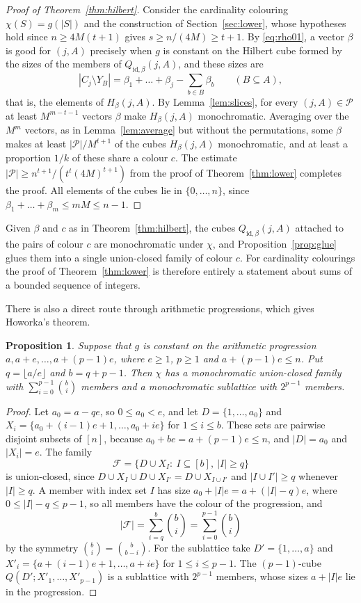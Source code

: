 \documentclass[11pt,reqno]{amsart}
\numberwithin{equation}{section}
\theoremstyle{plain}
\newtheorem{proposition}[theorem]{Proposition}
\theoremstyle{definition}
\theoremstyle{remark}
\newcommand{\cF}{\mathcal{F}}
\newcommand{\cP}{\mathcal{P}}
\begin{document}
\begin{proof}[Proof of Theorem~\ref{thm:hilbert}]
Consider the cardinality colouring $\chi(S)=g(|S|)$ and the construction
of Section~\ref{sec:lower}, whose hypotheses hold since $n\ge4M(t+1)$
gives $s\ge n/(4M)\ge t+1$. By \eqref{eq:rho01}, a vector $\beta$ is good
for $(j,A)$ precisely when $g$ is constant on the Hilbert cube formed by
the sizes of the members of $Q_{\mathrm{id},\beta}(j,A)$, and these sizes
are
\[
|C_j\setminus Y_B|=\beta_1+\dots+\beta_j-\sum_{b\in B}\beta_b
\qquad(B\subseteq A),
\]
that is, the elements of $H_\beta(j,A)$. By Lemma~\ref{lem:slices}, for
every $(j,A)\in\cP$ at least $M^{m-t-1}$ vectors $\beta$ make
$H_\beta(j,A)$ monochromatic. Averaging over the $M^{m}$ vectors, as in
Lemma~\ref{lem:average} but without the permutations, some $\beta$ makes
at least $|\cP|/M^{t+1}$ of the cubes $H_\beta(j,A)$ monochromatic, and
at least a proportion $1/k$ of these share a colour $c$. The estimate
$|\cP|\ge n^{t+1}/(t^{t}(4M)^{t+1})$ from the proof of
Theorem~\ref{thm:lower} completes the proof. All elements of the cubes
lie in $\{0,\dots,n\}$, since $\beta_1+\dots+\beta_m\le mM\le n-1$.
\end{proof}

Given $\beta$ and $c$ as in Theorem~\ref{thm:hilbert}, the cubes
$Q_{\mathrm{id},\beta}(j,A)$ attached to the pairs of colour $c$ are
monochromatic under $\chi$, and Proposition~\ref{prop:glue} glues them
into a single union-closed family of colour $c$. For cardinality
colourings the proof of Theorem~\ref{thm:lower} is therefore entirely a
statement about sums of a bounded sequence of integers.

There is also a direct route through arithmetic progressions, which gives
Howorka's theorem.

\begin{proposition}
\label{prop:AP}
Suppose that $g$ is constant on the arithmetic progression
$a,a+e,\dots,a+(p-1)e$, where $e\ge1$, $p\ge1$ and $a+(p-1)e\le n$. Put
$q=\lfloor a/e\rfloor$ and $b=q+p-1$. Then $\chi$ has a monochromatic
union-closed family with $\sum_{i=0}^{p-1}\binom bi$ members and a
monochromatic sublattice with $2^{p-1}$ members.
\end{proposition}

\begin{proof}
Let $a_0=a-qe$, so $0\le a_0<e$, and let $D=\{1,\dots,a_0\}$ and
$X_i=\{a_0+(i-1)e+1,\dots,a_0+ie\}$ for $1\le i\le b$. These sets are
pairwise disjoint subsets of $[n]$, because $a_0+be=a+(p-1)e\le n$, and
$|D|=a_0$ and $|X_i|=e$. The family
\[
\cF=\bigl\{D\cup X_I:\ I\subseteq[b],\ |I|\ge q\bigr\}
\]
is union-closed, since $D\cup X_I\cup D\cup X_{I'}=D\cup X_{I\cup I'}$ and
$|I\cup I'|\ge q$ whenever $|I|\ge q$. A member with index set $I$ has
size $a_0+|I|e=a+(|I|-q)e$, where $0\le|I|-q\le p-1$, so all members have
the colour of the progression, and
\[
|\cF|=\sum_{i=q}^{b}\binom bi=\sum_{i=0}^{p-1}\binom bi
\]
by the symmetry $\binom bi=\binom b{b-i}$. For the sublattice take
$D'=\{1,\dots,a\}$ and $X'_i=\{a+(i-1)e+1,\dots,a+ie\}$ for $1\le i\le
p-1$. The $(p-1)$-cube $Q(D';X'_1,\dots,X'_{p-1})$ is a sublattice with
$2^{p-1}$ members, whose sizes $a+|I|e$ lie in the progression.
\end{proof}
\end{document}
